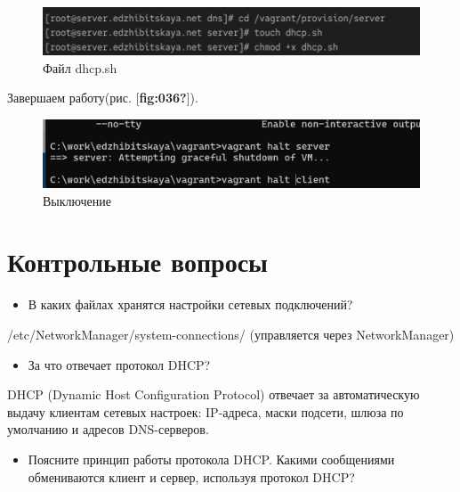 \documentclass[
  english,
  russian,
  12pt,
  a4paper,
  DIV=11,
  numbers=noendperiod]{scrreprt}
\providecommand{\tightlist}{%
  \setlength{\itemsep}{0pt}\setlength{\parskip}{0pt}}
\begin{document}
\begin{figure}

{\centering \includegraphics[width=0.7\linewidth,height=\textheight,keepaspectratio]{image/35.jpg}

}

\caption{Файл dhcp.sh}

\end{figure}%

Завершаем работу(рис. {[}\textbf{fig:036?}{]}).

\begin{figure}

{\centering \includegraphics[width=0.7\linewidth,height=\textheight,keepaspectratio]{image/36.jpg}

}

\caption{Выключение}

\end{figure}%

\chapter{Контрольные
вопросы}\label{ux43aux43eux43dux442ux440ux43eux43bux44cux43dux44bux435-ux432ux43eux43fux440ux43eux441ux44b}

\begin{itemize}
\tightlist
\item
  В каких файлах хранятся настройки сетевых подключений?
\end{itemize}

/etc/NetworkManager/system-connections/ (управляется через
NetworkManager)

\begin{itemize}
\tightlist
\item
  За что отвечает протокол DHCP?
\end{itemize}

DHCP (Dynamic Host Configuration Protocol) отвечает за автоматическую
выдачу клиентам сетевых настроек: IP-адреса, маски подсети, шлюза по
умолчанию и адресов DNS-серверов.

\begin{itemize}
\tightlist
\item
  Поясните принцип работы протокола DHCP. Какими сообщениями
  обмениваются клиент и сервер, используя протокол DHCP?
\end{itemize}
\end{document}
